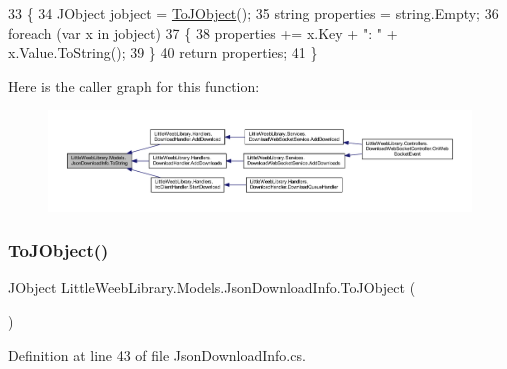 \begin{DoxyCode}
33         \{
34             JObject jobject = \mbox{\hyperlink{class_little_weeb_library_1_1_models_1_1_json_download_info_a9a8921b52b118be5bc135ad49a4aee29}{ToJObject}}();
35             \textcolor{keywordtype}{string} properties = \textcolor{keywordtype}{string}.Empty;
36             \textcolor{keywordflow}{foreach} (var x \textcolor{keywordflow}{in} jobject)
37             \{
38                 properties += x.Key + \textcolor{stringliteral}{": "} + x.Value.ToString();
39             \}
40             \textcolor{keywordflow}{return} properties;
41         \}
\end{DoxyCode}
Here is the caller graph for this function\+:\nopagebreak
\begin{figure}[H]
\begin{center}
\leavevmode
\includegraphics[width=350pt]{class_little_weeb_library_1_1_models_1_1_json_download_info_af36cbb3251b0efcd80a45f1fef89f5c9_icgraph}
\end{center}
\end{figure}
\mbox{\label{class_little_weeb_library_1_1_models_1_1_json_download_info_a9a8921b52b118be5bc135ad49a4aee29}} 
\subsubsection{\texorpdfstring{To\+J\+Object()}{ToJObject()}}
{\footnotesize\ttfamily J\+Object Little\+Weeb\+Library.\+Models.\+Json\+Download\+Info.\+To\+J\+Object (\begin{DoxyParamCaption}{ }\end{DoxyParamCaption})}



Definition at line 43 of file Json\+Download\+Info.\+cs.



